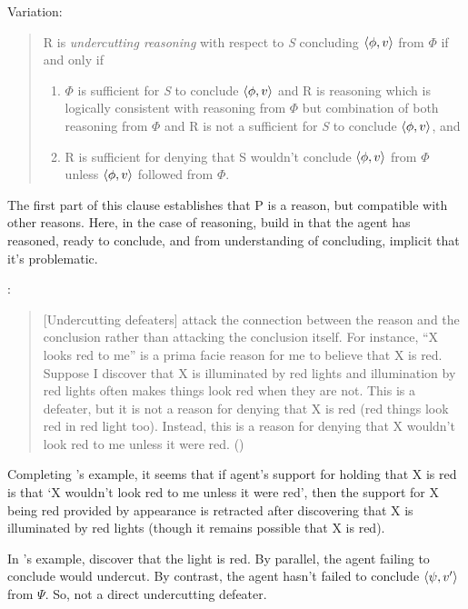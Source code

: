 \begin{note}
{    Variation:
    \begin{quote}
      R is \emph{undercutting reasoning} with respect to \emph{S} concluding \(\langle \phi, v \rangle\) from \(\Phi\) if and only if
      \begin{enumerate}[label=(UR\arabic*), ref=(UR\arabic*)]
      \item
        \(\Phi\) is sufficient for \emph{S} to conclude \(\langle \phi, v \rangle\) and R is reasoning which is logically consistent with reasoning from \(\Phi\) but combination of both reasoning from \(\Phi\) and R is not a sufficient for \emph{S} to conclude \(\langle \phi, v \rangle\), and
      \item
        R is sufficient for denying that S wouldn't conclude \(\langle \phi, v \rangle\) from \(\Phi\) unless \(\langle \phi, v \rangle\) followed from \(\Phi\).%
      \end{enumerate}
    \end{quote}
    The first part of this clause establishes that P is a reason, but compatible with other reasons.
    Here, in the case of reasoning, build in that the agent has reasoned, ready to conclude, and from understanding of concluding, implicit that it's problematic.
  }%
  :
  \begin{quote}
    [Undercutting defeaters] attack the connection between the reason and the conclusion rather than attacking the conclusion itself.
    For instance, ``X looks red to me'' is a prima facie reason for me to believe that X is red.
    Suppose I discover that X is illuminated by red lights and illumination by red lights often makes things look red when they are not.
    This is a defeater, but it is not a reason for denying that X is red (red things look red in red light too).
    Instead, this is a reason for denying that X wouldn't look red to me unless it were red.%
    \mbox{}\hfill\mbox{(\citeyear[485]{Pollock:1987un})}
  \end{quote}
  Completing \citeauthor{Pollock:1987un}'s example, it seems that if agent's support for holding that X is red is that `X wouldn't look red to me unless it were red', then the support for X being red provided by appearance is retracted after discovering that X is illuminated by red lights (though it remains possible that X is red).
\end{note}

\begin{note}
  In \citeauthor{Pollock:1987un}'s example, discover that the light is red.
  By parallel, the agent failing to conclude would undercut.
  By contrast, the agent hasn't failed to conclude \(\langle \psi, v' \rangle\) from \(\Psi\).
  So, not a direct undercutting defeater.
\end{note}

